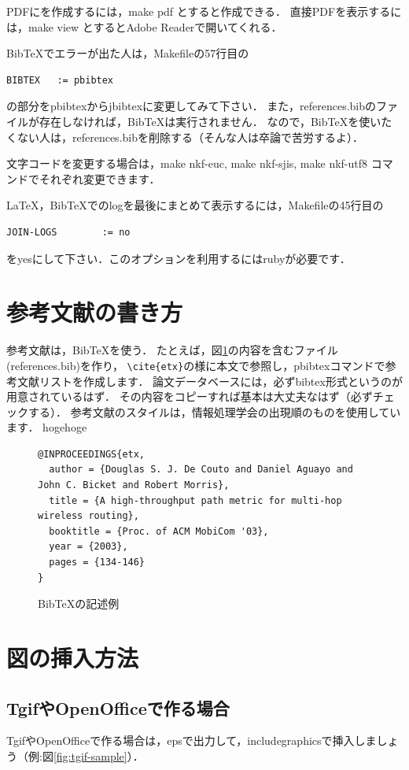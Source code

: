 \documentclass[submit,techreq,noauthor]{eco}	%
\begin{document}
PDFにを作成するには，make pdf とすると作成できる．
直接PDFを表示するには，make view とするとAdobe Readerで開いてくれる．

BibTeXでエラーが出た人は，Makefileの57行目の
\begin{lstlisting}
BIBTEX   := pbibtex
\end{lstlisting}
の部分をpbibtexからjbibtexに変更してみて下さい．
また，references.bibのファイルが存在しなければ，BibTeXは実行されません．
なので，BibTeXを使いたくない人は，references.bibを削除する（そんな人は卒論で苦労するよ）．

文字コードを変更する場合は，make nkf-euc, make nkf-sjis, make nkf-utf8 コマンドでそれぞれ変更できます．

LaTeX，BibTeXでのlogを最後にまとめて表示するには，Makefileの45行目の
\begin{lstlisting}
JOIN-LOGS        := no
\end{lstlisting}
をyesにして下さい．このオプションを利用するにはrubyが必要です．


\section{参考文献の書き方}
参考文献は，BibTeXを使う．
たとえば，図\ref{fig:bibsample}の内容を含むファイル(references.bib)を作り，
\verb|\cite{etx}|の様に本文で参照\cite{etx}し，pbibtexコマンドで参考文献リストを作成します．
論文データベースには，必ずbibtex形式というのが用意されているはず．
その内容をコピーすれば基本は大丈夫なはず（必ずチェックする）．
参考文献のスタイルは，情報処理学会の出現順のものを使用しています．
hogehoge

\begin{figure}[t]
    \centering
    \begin{lstlisting}
@INPROCEEDINGS{etx,
  author = {Douglas S. J. De Couto and Daniel Aguayo and John C. Bicket and Robert Morris},
  title = {A high-throughput path metric for multi-hop wireless routing},
  booktitle = {Proc. of ACM MobiCom '03},
  year = {2003},
  pages = {134-146}
}
    \end{lstlisting}
    \vspace{-2mm}
    \caption{BibTeXの記述例}
    \label{fig:bibsample}
\end{figure}


\section{図の挿入方法}
\subsection{TgifやOpenOfficeで作る場合}
TgifやOpenOfficeで作る場合は，epsで出力して，includegraphicsで挿入しましょう（例:図\ref{fig:tgif-sample}）．
\end{document}
